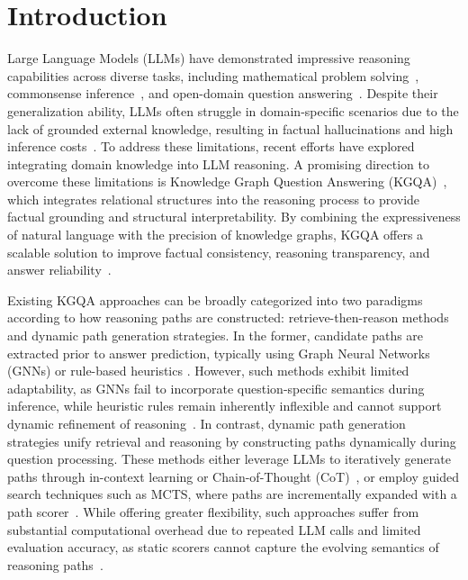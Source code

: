 \section{Introduction}

Large Language Models (LLMs) have demonstrated impressive reasoning capabilities across diverse tasks, including mathematical problem solving~\citep{pei2025mathfusion,didolkar2024metacognitive}, commonsense inference~\citep{toroghi2024verifiable}, and open-domain question answering~\citep{zhao2023divknowqa}. 
Despite their generalization ability, LLMs often struggle in domain-specific scenarios due to the lack of grounded external knowledge, resulting in factual hallucinations and high inference costs~\citep{huang2025survey,wang2024factuality}. To address these limitations, recent efforts have explored integrating domain knowledge into LLM reasoning. A promising direction to overcome these limitations is Knowledge Graph Question Answering (KGQA)~\citep{dammu2025dynamic,saxena2020improving,choi2023nutrea}, which integrates relational structures into the reasoning process to provide factual grounding and structural interpretability. By combining the expressiveness of natural language with the precision of knowledge graphs, KGQA offers a scalable solution to improve factual consistency, reasoning transparency, and answer reliability~\citep{liu2025dual,yao2025learning}. 

Existing KGQA approaches can be broadly categorized into two paradigms according to how reasoning paths are constructed: retrieve-then-reason methods and dynamic path generation strategies. In the former, candidate paths are extracted prior to answer prediction, typically using Graph Neural Networks (GNNs) \citep{ma2025debate,yao2025learning} or rule-based heuristics \citep{fang2024karpa}. However, such methods exhibit limited adaptability, as GNNs fail to incorporate question-specific semantics during inference, while heuristic rules remain inherently inflexible and cannot support dynamic refinement of reasoning~\citep{liu2025dual,yao2025learning}. In contrast, dynamic path generation strategies unify retrieval and reasoning by constructing paths dynamically during question processing. These methods either leverage LLMs to iteratively generate paths through in-context learning or Chain-of-Thought (CoT)~\citep{sui2024fidelis,li2024framework}, or employ guided search techniques such as MCTS, where paths are incrementally expanded with a path scorer~\citep{ma2025deliberation,shen2025reasoning}. While offering greater flexibility, such approaches suffer from substantial computational overhead due to repeated LLM calls and limited evaluation accuracy, as static scorers cannot capture the evolving semantics of reasoning paths~\citep{chang2024survey,lee2024zero}.

